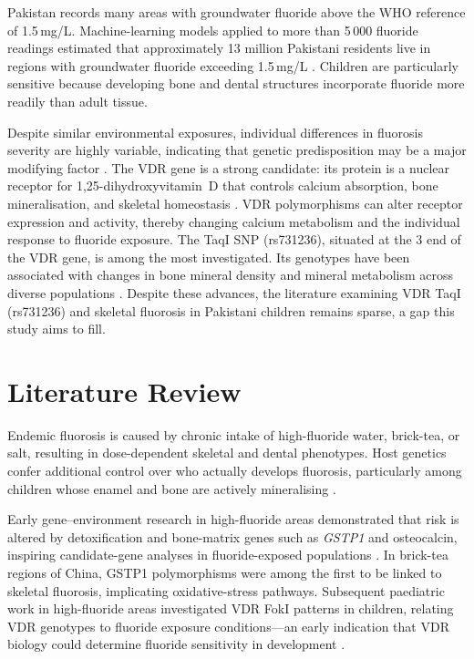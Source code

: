 \documentclass[12pt,a4paper]{article}
\begin{document}
Pakistan records many areas with groundwater fluoride above the WHO reference of 1.5\,mg/L.
Machine-learning models applied to more than 5\,000 fluoride readings estimated that approximately
13 million Pakistani residents live in regions with groundwater fluoride exceeding 1.5\,mg/L
\citep{Khan2023}. Children are particularly sensitive because developing bone and dental structures
incorporate fluoride more readily than adult tissue.

Despite similar environmental exposures, individual differences in fluorosis severity are highly
variable, indicating that genetic predisposition may be a major modifying factor \citep{Wang2022}.
The VDR gene is a strong candidate: its protein is a nuclear receptor for 1,25-dihydroxyvitamin~D
that controls calcium absorption, bone mineralisation, and skeletal homeostasis \citep{Holick2006}.
VDR polymorphisms can alter receptor expression and activity, thereby changing calcium metabolism
and the individual response to fluoride exposure. The TaqI SNP (rs731236), situated at the 3
end of the VDR gene, is among the most investigated. Its genotypes have been associated with
changes in bone mineral density and mineral metabolism across diverse populations
\citep{Gorczynska2024}. Despite these advances, the literature examining VDR TaqI (rs731236)
and skeletal fluorosis in Pakistani children remains sparse, a gap this study aims to fill.

\section{Literature Review}

Endemic fluorosis is caused by chronic intake of high-fluoride water, brick-tea, or salt, resulting in
dose-dependent skeletal and dental phenotypes. Host genetics confer additional control over who
actually develops fluorosis, particularly among children whose enamel and bone are actively
mineralising \citep{Pramanik2017, Niazi2023}.

Early gene–environment research in high-fluoride areas demonstrated that risk is altered by
detoxification and bone-matrix genes such as \textit{GSTP1} and osteocalcin, inspiring
candidate-gene analyses in fluoride-exposed populations \citep{Wu2015}. In brick-tea regions of
China, GSTP1 polymorphisms were among the first to be linked to skeletal fluorosis, implicating
oxidative-stress pathways. Subsequent paediatric work in high-fluoride areas investigated VDR
FokI patterns in children, relating VDR genotypes to fluoride exposure conditions---an early
indication that VDR biology could determine fluoride sensitivity in development \citep{Yang2011}.
\end{document}
